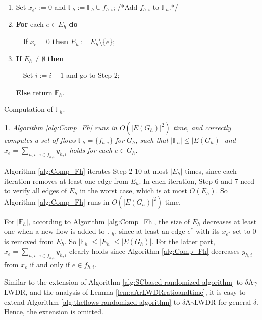 \documentclass[11pt,english,onecolumn,draftcls]{IEEEtran}
\theoremstyle{plain}
\theoremstyle{plain}
\theoremstyle{plain}
\newtheorem{lem}[thm]{\protect\lemmaname}
\theoremstyle{plain}
\providecommand{\lemmaname}{Lemma}
\begin{document}
\begin{algorithm}
\begin{enumerate}
\item Set $x_{e^{*}}:=0$ and $\mathbb{F}_{h}:=\mathbb{F}_{h}\cup f_{h,i}$;
/{*}Add $f_{h,i}$ to $\mathbb{F}_{h}$.{*}/
\item \textbf{For} each $e\in E_{h}$ \textbf{do}


$\quad$If $x_{e}=0$ \textbf{then} $E_{h}:=E_{h}\setminus\{e\}$;

\item \textbf{If} $E_{h}\neq\emptyset$ \textbf{then}


$\quad$Set $i:=i+1$ and go to Step 2;


\textbf{Else} return $\mathbb{F}_{h}$.

\end{enumerate}
\protect\caption{\label{alg:Comp_Fh}Computation of $\mathbb{F}_{h}$.}
\end{algorithm}

\begin{lem}
\label{lem:timeofcompFh}Algorithm \ref{alg:Comp_Fh} runs in $O(\vert E(G_{h})\vert^{2})$
time, and correctly computes a set of flows $\mathbb{F}_{h}=\{f_{h,i}\}$
for $G_{h}$, such that $\vert\mathbb{F}_{h}\vert\leq\vert E(G_{h})\vert$
and $x_{e}=\sum_{h,i:\, e\in f_{h,i}}y_{h,i}$ holds for each $e\in G_{h}$.\end{lem}
\begin{IEEEproof}
Algorithm \ref{alg:Comp_Fh} iterates Step 2-10 at most $\vert E_{h}\vert$
times, since each iteration removes at least one edge from $E_{h}$.
In each iteration, Step 6 and 7 need to verify all edges of $E_{h}$
in the worst case, which is at most $O(E_{h})$. So Algorithm \ref{alg:Comp_Fh}
runs in $O(\vert E(G_{h})\vert^{2})$ time.

For $\vert\mathbb{F}_{h}\vert$, according to Algorithm \ref{alg:Comp_Fh},
the size of $E_{h}$ decreases at least one when a new flow is added
to $\mathbb{F}_{h}$, since at least an edge $e^{*}$ with its $x_{e^{*}}$
set to 0 is removed from $E_{h}$. So $\vert\mathbb{F}_{h}\vert\leq\vert E_{h}\vert\leq\vert E(G_{h})\vert$.
For the latter part, $x_{e}=\sum_{h,i:\, e\in f_{h,i}}y_{h,i}$ clearly
holds since Algorithm \ref{alg:Comp_Fh} decreases $y_{h,i}$ from
$x_{e}$ if and only if $e\in f_{h,i}$.
\end{IEEEproof}
Similar to the extension of Algorithm \ref{alg:SCbased-randomized-algorithm}
to $\delta$A$\gamma$LWDR, and the analysis of Lemma \ref{lem:aArLWDRratioandtime},
it is easy to extend Algorithm \ref{alg:theflows-randomized-algorithm}
to $\delta$A$\gamma$LWDR for general $\delta$. Hence, the extension
is omitted.
\end{document}
